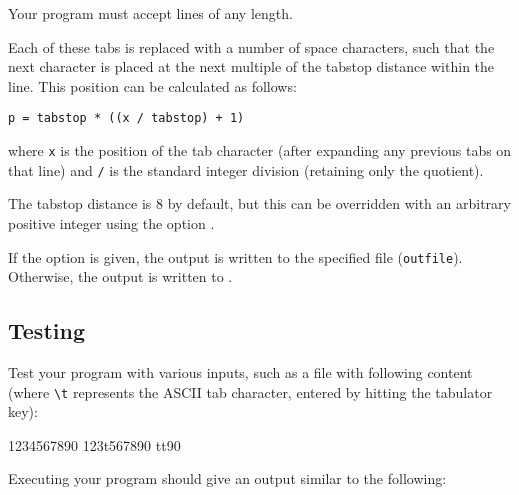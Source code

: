 Your program must accept lines of any length.

Each of these tabs is replaced with a number of space characters,
such that the next character
is placed at the next multiple of the tabstop distance within the line.
This position can be calculated as follows:

\verb|p = tabstop * ((x / tabstop) + 1)|

where \verb|x| is the position of the tab character
(after expanding any previous tabs on that line)
and \verb|/| is the standard integer division (retaining only the quotient).

The tabstop distance is 8 by default,
but this can be overridden with an arbitrary positive integer
using the option .

If the option  is given,
the output is written to the specified file (\verb|outfile|).
Otherwise, the output is written to .

\subsection*{Testing}

Test your program with various inputs,
such as a file  with following content
(where \verb|\t| represents the ASCII tab character,
entered by hitting the tabulator key):

\begin{osuefmtcode}
    1234567890
    123\bslash{}t567890
    \bslash{}t\bslash{}t90
\end{osuefmtcode}

Executing your program should give an output similar to the following:


\osueguidelinesone


